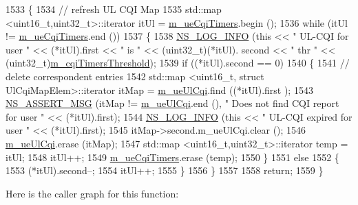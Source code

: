 \begin{DoxyCode}
1533 \{
1534   \textcolor{comment}{// refresh UL CQI  Map}
1535   std::map <uint16\_t,uint32\_t>::iterator itUl = \hyperlink{classns3_1_1MmWaveFlexTtiPfMacScheduler_a298ebdb8e99005d1d765e317e8a9cf8d}{m\_ueCqiTimers}.begin ();
1536   \textcolor{keywordflow}{while} (itUl != \hyperlink{classns3_1_1MmWaveFlexTtiPfMacScheduler_a298ebdb8e99005d1d765e317e8a9cf8d}{m\_ueCqiTimers}.end ())
1537     \{
1538       \hyperlink{group__logging_gafbd73ee2cf9f26b319f49086d8e860fb}{NS\_LOG\_INFO} (\textcolor{keyword}{this} << \textcolor{stringliteral}{" UL-CQI for user "} << (*itUl).first << \textcolor{stringliteral}{" is "} << (uint32\_t)(*itUl).
      second << \textcolor{stringliteral}{" thr "} << (uint32\_t)\hyperlink{classns3_1_1MmWaveFlexTtiPfMacScheduler_ad61563379565ec249cdf6b4092fef22e}{m\_cqiTimersThreshold});
1539       \textcolor{keywordflow}{if} ((*itUl).second == 0)
1540         \{
1541           \textcolor{comment}{// delete correspondent entries}
1542           std::map <uint16\_t, struct UlCqiMapElem>::iterator itMap = \hyperlink{classns3_1_1MmWaveFlexTtiPfMacScheduler_a16923ad9de133d3dc54aa5cd0e524b31}{m\_ueUlCqi}.find ((*itUl).first
      );
1543           \hyperlink{assert_8h_aff5ece9066c74e681e74999856f08539}{NS\_ASSERT\_MSG} (itMap != \hyperlink{classns3_1_1MmWaveFlexTtiPfMacScheduler_a16923ad9de133d3dc54aa5cd0e524b31}{m\_ueUlCqi}.end (), \textcolor{stringliteral}{" Does not find CQI report for
       user "} << (*itUl).first);
1544           \hyperlink{group__logging_gafbd73ee2cf9f26b319f49086d8e860fb}{NS\_LOG\_INFO} (\textcolor{keyword}{this} << \textcolor{stringliteral}{" UL-CQI expired for user "} << (*itUl).first);
1545           itMap->second.m\_ueUlCqi.clear ();
1546           \hyperlink{classns3_1_1MmWaveFlexTtiPfMacScheduler_a16923ad9de133d3dc54aa5cd0e524b31}{m\_ueUlCqi}.erase (itMap);
1547           std::map <uint16\_t,uint32\_t>::iterator temp = itUl;
1548           itUl++;
1549           \hyperlink{classns3_1_1MmWaveFlexTtiPfMacScheduler_a298ebdb8e99005d1d765e317e8a9cf8d}{m\_ueCqiTimers}.erase (temp);
1550         \}
1551       \textcolor{keywordflow}{else}
1552         \{
1553           (*itUl).second--;
1554           itUl++;
1555         \}
1556     \}
1557 
1558   \textcolor{keywordflow}{return};
1559 \}
\end{DoxyCode}


Here is the caller graph for this function\+:


